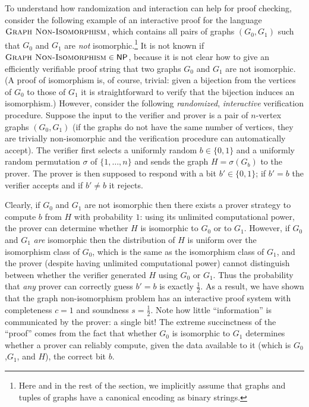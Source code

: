 \documentclass[11pt]{article}
\theoremstyle{definition}
\newcommand{\GNI}{\textsc{Graph Non-Isomorphism}}
\newcommand{\class}[1]{\ensuremath{\mathsf{#1}}\xspace}
\newcommand{\NP}{\class{NP}} \newcommand{\IP}{\class{IP}} \newcommand{\EXP}{\class{EXP}} \newcommand{\NEXP}{\class{NEXP}} \newcommand{\QMA}{\class{QMA}} \newcommand{\QMIP}{\class{QMIP}} \WithSuffix\newcommand\QMIP*{\ensuremath{\class{QMIP}^*}} \newcommand{\PSPACE}{\class{PSPACE}} \newcommand{\PCP}{\class{PCP}} \newcommand{\MIP}{\class{MIP}} \newcommand{\MIPco}{\class{MIP}^{\mathrm{co}}} \newcommand{\RE}{\class{RE}} \newcommand{\coRE}{\class{coRE}}
\begin{document}
To understand how randomization and interaction can help for proof checking, consider the following example of an interactive proof for the language $\GNI$, which contains all pairs of graphs $(G_0,G_1)$ such that $G_0$ and $G_1$ are \emph{not} isomorphic.\footnote{Here and in the rest of the section, we implicitly assume that graphs and tuples of graphs have a canonical encoding as binary strings.}
It is not known if $\GNI\in \NP$, because it is not clear how to give an efficiently verifiable proof string that two graphs $G_0$ and $G_1$ are not isomorphic. (A proof of isomorphism is, of course, trivial: given a bijection from the vertices of $G_0$ to those of $G_1$ it is straightforward to verify that the bijection induces an isomorphism.) However, consider the following \emph{randomized}, \emph{interactive} verification procedure. Suppose the input to the verifier and prover is a pair of $n$-vertex graphs $(G_0,G_1)$ (if the graphs do not have the same number of vertices, they are trivially non-isomorphic and the verification procedure can automatically accept). The verifier first selects a uniformly random $b\in \{0,1\}$ and a uniformly random permutation $\sigma$ of $\{1,\ldots,n\}$ and sends the graph $H = \sigma( G_b)$ to the prover. The prover is then supposed to respond with a bit $b'\in \{0,1\}$; if $b'=b$  the verifier accepts and if $b'\neq b$ it rejects. 

Clearly, if $G_0$ and $G_1$ are not isomorphic then there exists a prover {strategy} to compute $b$ from $H$ with probability $1$: using its unlimited computational power, the prover can determine whether $H$ is isomorphic to $G_0$ or to $G_1$. However, if $G_0$ and $G_1$ \emph{are} isomorphic then the distribution of $H$ is uniform over the isomorphism class of $G_0$, which is the same as the isomorphism class of $G_1$, and the prover (despite having unlimited computational power) cannot distinguish between whether the verifier generated $H$ using $G_0$ or $G_1$. Thus the probability that \emph{any} prover can correctly guess $b'=b$ is exactly $\frac{1}{2}$. As a result, we have shown that the graph non-isomorphism problem has an interactive proof system with completeness $c=1$ and soundness $s=\frac{1}{2}$. Note how little ``information'' is communicated by the prover: a single bit!
The extreme succinctness of the ``proof'' comes from the fact that whether $G_0$ is isomorphic to $G_1$ determines whether a prover can reliably compute, given the data available to it (which is $G_0$,$G_1$, and $H$), the correct bit $b$.
\end{document}
